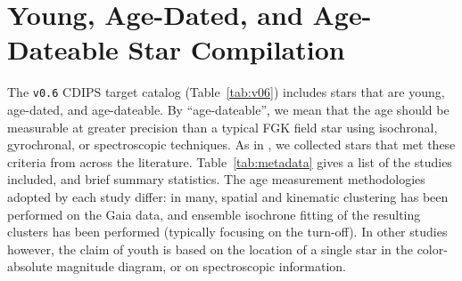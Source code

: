 \documentclass[12pt,modern,twocolumn,tighten]{aastex63}
\begin{document}







\clearpage
                            
 

\appendix
\section{Young, Age-Dated, and Age-Dateable Star Compilation}
\label{app:targetlist}


The \texttt{v0.6} CDIPS target catalog (Table~\ref{tab:v06}) includes stars
that are young, age-dated, and age-dateable.  By ``age-dateable'', we mean that
the age should be measurable at greater precision than a typical FGK field star
using isochronal, gyrochronal, or spectroscopic techniques.
As in
\citet{bouma_cdipsI_2019}, we collected stars that met these criteria
from across the literature.  Table~\ref{tab:metadata} gives a list of
the studies included, and brief summary statistics.
The age measurement methodologies adopted by each study differ: in many,
spatial and kinematic clustering has been performed on the Gaia data,
and ensemble isochrone fitting of the resulting clusters has been performed
(typically focusing on the turn-off).
In other studies however, the claim of youth is based on the location of a
single star in the color-absolute magnitude diagram, or on spectroscopic
information.
\end{document}
